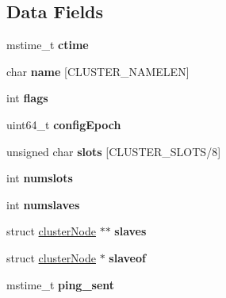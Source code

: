 \subsection*{Data Fields}
\begin{DoxyCompactItemize}
\item 
\mbox{\label{structclusterNode_aa33a6402dfdda11c2b84272b262ee945}} 
mstime\+\_\+t {\bfseries ctime}
\item 
\mbox{\label{structclusterNode_ae0214470697f2a171d6cdd3493facbb2}} 
char {\bfseries name} \mbox{[}C\+L\+U\+S\+T\+E\+R\+\_\+\+N\+A\+M\+E\+L\+EN\mbox{]}
\item 
\mbox{\label{structclusterNode_a496b52bc0e6536e9556c6eb2779c03eb}} 
int {\bfseries flags}
\item 
\mbox{\label{structclusterNode_aa72bc6455e36e662bc5a53fc427452a5}} 
uint64\+\_\+t {\bfseries config\+Epoch}
\item 
\mbox{\label{structclusterNode_a8c8302e4633d2d0094fa621ecfcf1b52}} 
unsigned char {\bfseries slots} \mbox{[}C\+L\+U\+S\+T\+E\+R\+\_\+\+S\+L\+O\+TS/8\mbox{]}
\item 
\mbox{\label{structclusterNode_a369c3823027d5aef6928189b480f52ee}} 
int {\bfseries numslots}
\item 
\mbox{\label{structclusterNode_a7e3b31fb7e833940d50a5a7d7d1f148d}} 
int {\bfseries numslaves}
\item 
\mbox{\label{structclusterNode_a35eac3f31a0acdbb1cf8d20fff406da6}} 
struct \hyperlink{structclusterNode}{cluster\+Node} $\ast$$\ast$ {\bfseries slaves}
\item 
\mbox{\label{structclusterNode_aabb2536cdf382cec6d810aaf0ba9f58a}} 
struct \hyperlink{structclusterNode}{cluster\+Node} $\ast$ {\bfseries slaveof}
\item 
\mbox{\label{structclusterNode_ab3eb79015f20bf51dc971da964133f0b}} 
mstime\+\_\+t {\bfseries ping\+\_\+sent}
\item 
$$
\end{DoxyCompactItemize}
